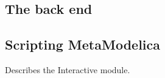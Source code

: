 %
%    

\subsection{The back end}
\subsection{Scripting MetaModelica}
\label{sec:mm_scripting}
Describes the Interactive module.
